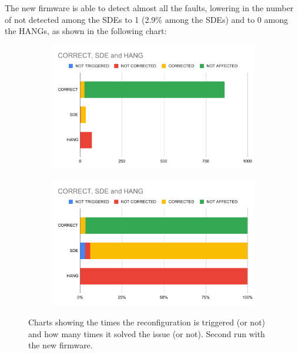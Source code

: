 The new firmware is able to detect almost all the faults, lowering in the number of not detected among the SDEs to 1 (2.9\% among the SDEs) and to 0 among the HANGs, as shown in the following chart:

\begin{figure}[H]
  \centering
  \begin{minipage}[t]{.49\linewidth}
  \begin{figure}[H]
  \centering
    \includegraphics[width=\linewidth]{images/chapter5/csh3.pdf}
  \end{figure}
  \end{minipage}
  \hfill
  \begin{minipage}[t]{.49\linewidth}
  \begin{figure}[H]
	\centering
    \includegraphics[width=\linewidth]{images/chapter5/csh4.pdf}
  \end{figure}
  \end{minipage}
  \caption{Charts showing the times the reconfiguration is triggered (or not) and how many times it solved the issue (or not). Second run with the new firmware.}
\end{figure}
